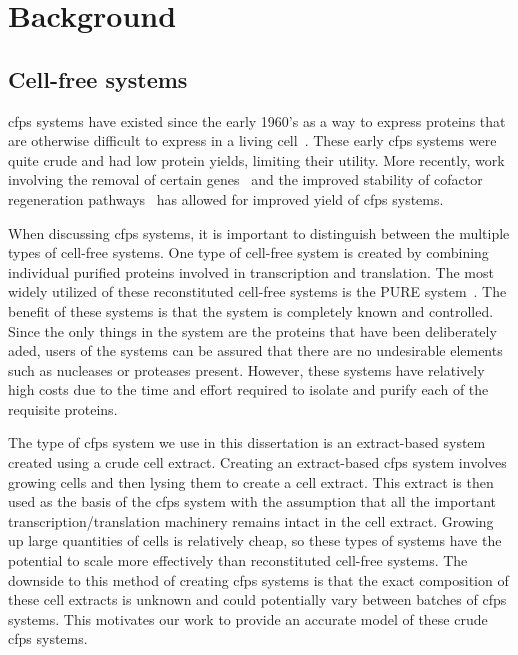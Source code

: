 \chapter{Background}\label{chap:bkg}


\section{Cell-free systems}
\gls{cfps} systems have existed since the early 1960's as a way to express proteins that are otherwise difficult to express in a living cell~\cite{nirenberg1961dependence}.
These early \gls{cfps} systems were quite crude and had low protein yields, limiting their utility.
More recently, work involving the removal of certain genes~\cite{calhoun2006total} and the improved stability of cofactor regeneration pathways~\cite{jewett2008integrated} has allowed for improved yield of \gls{cfps} systems.

When discussing \gls{cfps} systems, it is important to distinguish between the multiple types of cell-free systems.
One type of cell-free system is created by combining individual purified proteins involved in transcription and translation.
The most widely utilized of these reconstituted cell-free systems is the PURE system~\cite{shimizu2001cell}.
The benefit of these systems is that the system is completely known and controlled.
Since the only things in the system are the proteins that have been deliberately aded, users of the systems can be assured that there are no undesirable elements such as nucleases or proteases present.
However, these systems have relatively high costs due to the time and effort required to isolate and purify each of the requisite proteins.

The type of \gls{cfps} system we use in this dissertation is an extract-based system created using a crude cell extract.
Creating an extract-based \gls{cfps} system involves growing cells and then lysing them to create a cell extract.
This extract is then used as the basis of the \gls{cfps} system with the assumption that all the important transcription/translation machinery remains intact in the cell extract.
Growing up large quantities of cells is relatively cheap, so these types of systems have the potential to scale more effectively than reconstituted cell-free systems. 
The downside to this method of creating \gls{cfps} systems is that the exact composition of these cell extracts is unknown and could potentially vary between batches of \gls{cfps} systems.
This motivates our work to provide an accurate model of these crude \gls{cfps} systems.

